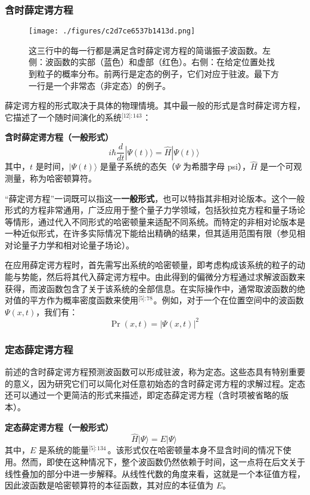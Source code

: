 \subsubsection{含时薛定谔方程}
\begin{figure}[ht]
\centering
\texttt{[image: ./figures/c2d7ce6537b1413d.png]}
\caption{这三行中的每一行都是满足含时薛定谔方程的简谐振子波函数。左侧：波函数的实部（蓝色）和虚部（红色）。右侧：在给定位置处找到粒子的概率分布。前两行是定态的例子，它们对应于驻波。最下方一行是一个非常态（非定态）的例子。} \label{fig_XDEfc_2}
\end{figure}
薛定谔方程的形式取决于具体的物理情境。其中最一般的形式是含时薛定谔方程，它描述了一个随时间演化的系统\(^\text{[12]: 143}\) ：

\textbf{含时薛定谔方程（一般形式）}
$$
i\hbar \frac{d}{dt}|\Psi(t)\rangle = \hat{H}|\Psi(t)\rangle~
$$
其中，$t$ 是时间，$|\Psi(t)\rangle$ 是量子系统的态矢（$\Psi$ 为希腊字母 psi），$\hat{H}$ 是一个可观测量，称为哈密顿算符。

“薛定谔方程”一词既可以指这一\textbf{一般形式}，也可以特指其非相对论版本。这个一般形式的方程非常通用，广泛应用于整个量子力学领域，包括狄拉克方程和量子场论等情形，通过代入不同形式的哈密顿量来适配不同系统。而特定的非相对论版本是一种近似形式，在许多实际情况下能给出精确的结果，但其适用范围有限（参见相对论量子力学和相对论量子场论）。

在应用薛定谔方程时，首先需写出系统的哈密顿量，即考虑构成该系统的粒子的动能与势能，然后将其代入薛定谔方程中。由此得到的偏微分方程通过求解波函数来获得，而波函数包含了关于该系统的全部信息。在实际操作中，通常取波函数的绝对值的平方作为概率密度函数来使用\(^\text{[5]: 78 }\)。例如，对于一个在位置空间中的波函数 $\Psi(x, t)$，我们有：
$$
\Pr(x, t) = |\Psi(x, t)|^2~
$$
\subsubsection{定态薛定谔方程}
前述的含时薛定谔方程预测波函数可以形成驻波，称为定态。这些态具有特别重要的意义，因为研究它们可以简化对任意初始态的含时薛定谔方程的求解过程。定态还可以通过一个更简洁的形式来描述，即定态薛定谔方程（含时项被省略的版本）。

\textbf{定态薛定谔方程（一般形式）}
$$
\hat{H}|\Psi\rangle = E|\Psi\rangle~
$$
其中，$E$ 是系统的能量\(^\text{[5]: 134  }\)。该形式仅在哈密顿量本身不显含时间的情况下使用。然而，即使在这种情况下，整个波函数仍然依赖于时间，这一点将在后文关于线性叠加的部分中进一步解释。从线性代数的角度来看，这就是一个本征值方程，因此波函数是哈密顿算符的本征函数，其对应的本征值为 $E$。
